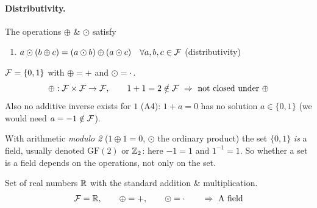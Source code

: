 \paragraph{Distributivity.} The operations $\oplus$ \& $\odot$ satisfy
\begin{enumerate}[label=(D),leftmargin=3.2em]
\item $a\odot(b\oplus c) = (a\odot b)\oplus(a\odot c) \quad \forall a,b,c\in\mathcal{F}$ \hfill (distributivity)
\end{enumerate}

\begin{example}
$\mathcal{F}=\{0,1\}$ with $\oplus = +$ and $\odot = \cdot$\,.
\[ \oplus: \mathcal{F}\times\mathcal{F}\to\mathcal{F}, \qquad 1+1=2\notin\mathcal{F} \ \Rightarrow\ \text{not closed under } \oplus \]
Also no additive inverse exists for $1$ (A4): $1+a=0$ has no solution $a\in\{0,1\}$ (we would need $a=-1\notin\mathcal{F}$).
\begin{insight}[Remark]
With arithmetic \emph{modulo 2} ($1\oplus1=0$, $\odot$ the ordinary product) the set $\{0,1\}$ \emph{is} a field, usually denoted $\mathrm{GF}(2)$ or $\mathbb{Z}_2$: here $-1=1$ and $1^{-1}=1$. So whether a set is a field depends on the operations, not only on the set.
\end{insight}
\end{example}

\begin{example}
Set of real numbers $\mathbb{R}$ with the standard addition \& multiplication.
\[ \mathcal{F}=\mathbb{R}, \qquad \oplus = +, \qquad \odot=\cdot \qquad \Rightarrow \text{ A field} \]
\end{example}

